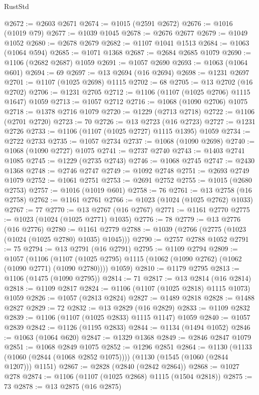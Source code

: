 \begin{lexlean}{RustStd}
\begin{coremodule}
@2672 := @2603 @2671
@2674 := @1015 (@2591 @2672)
@2676 := @1016 (@1019 @79)
@2677 := @1039 @1045
@2678 := @2676 @2677
@2679 := @1049 @1052
@2680 := @2678 @2679
@2682 := @1107 @1041 @1513
@2684 := @1063 (@1064 @594)
@2685 := @1071 @1368
@2687 := @2684 @2685 @1079
@2690 := @1106 (@2682 @2687) @1059
@2691 := @1057 @2690
@2693 := @1063 (@1064 @601)
@2694 := 69
@2697 := @13 @2694 (@16 @2694)
@2698 := @1231 @2697
@2701 := @1107 (@1025 @2698) @1115
@2702 := 68
@2705 := @13 @2702 (@16 @2702)
@2706 := @1231 @2705
@2712 := @1106 (@1107 (@1025 @2706) @1115 @1647) @1059
@2713 := @1057 @2712
@2716 := @1068 (@1090 @2706) @1075
@2718 := @1378 @2716 @1079
@2720 := @1229 (@2713 @2718)
@2722 := @1106 (@2701 @2720)
@2723 := 70
@2726 := @13 @2723 (@16 @2723)
@2727 := @1231 @2726
@2733 := @1106 (@1107 (@1025 @2727) @1115 @1395) @1059
@2734 := @2722 @2733
@2735 := @1057 @2734
@2737 := @1068 (@1090 @2698)
@2740 := @1068 (@1090 @2727) @1075
@2741 := @2737 @2740
@2743 := @1403 @2741 @1085
@2745 := @1229 (@2735 @2743)
@2746 := @1068 @2745
@2747 := @2430 @1368
@2748 := @2746 @2747
@2749 := @1092 @2748
@2751 := @2693 @2749 @1079
@2752 := @1061 @2751
@2753 := @2691 @2752
@2755 := @1015 (@2680 @2753)
@2757 := @1016 (@1019 @601)
@2758 := 76
@2761 := @13 @2758 (@16 @2758)
@2762 := @1161 @2761
@2766 := @1023 (@1024 (@1025 @2762) @1033)
@2767 := 77
@2770 := @13 @2767 (@16 @2767)
@2771 := @1161 @2770
@2775 := @1023 (@1024 (@1025 @2771) @1035)
@2776 := 78
@2779 := @13 @2776 (@16 @2776)
@2780 := @1161 @2779
@2788 := @1039 (@2766 (@2775 (@1023 (@1024 (@1025 @2780) @1035) @1045)))
@2790 := @2757 @2788 @1052
@2791 := 75
@2794 := @13 @2791 (@16 @2791)
@2795 := @1109 @2794
@2809 := @1057
    (@1106
      (@1107 (@1025 @2795) @1115 (@1062 (@1090 @2762) (@1062 (@1090 @2771) (@1090 @2780))))
      @1059)
@2810 := @1179 @2795
@2813 := @1106 (@1475 (@1090 @2795))
@2814 := 71
@2817 := @13 @2814 (@16 @2814)
@2818 := @1109 @2817
@2824 := @1106 (@1107 (@1025 @2818) @1115 @1073) @1059
@2826 := @1057 (@2813 @2824)
@2827 := @1489 @2818
@2828 := @1488 @2827
@2829 := 72
@2832 := @13 @2829 (@16 @2829)
@2833 := @1109 @2832
@2839 := @1106 (@1107 (@1025 @2833) @1115 @1147) @1059
@2840 := @1057 @2839
@2842 := @1126 (@1195 @2833)
@2844 := @1134 (@1494 @1052)
@2846 := @1063 (@1064 @620)
@2847 := @1329 @1368
@2849 := @2846 @2847 @1079
@2851 := @1068 @2849 @1075
@2852 := @1296 @2851
@2864 := @1130
    (@1133 (@1060 (@2844 (@1068 @2852 @1075))))
    (@1130 (@1545 (@1060 (@2844 @1207))) @1151)
@2867 := @2828 (@2840 (@2842 @2864))
@2868 := @1027 @278
@2874 := @1106 (@1107 (@1025 @2868) @1115 (@1504 @2818))
@2875 := 73
@2878 := @13 @2875 (@16 @2875)

\end{coremodule}
\end{lexlean}
